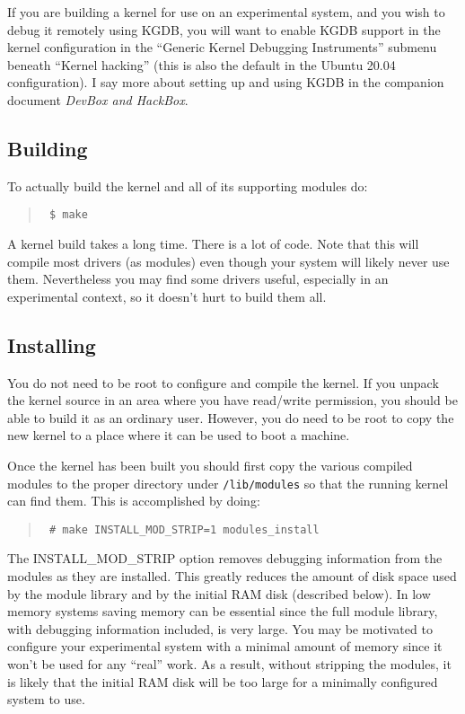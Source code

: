 \documentclass{article}
\newcommand{\filename}[1]{\texttt{#1}}
\newenvironment{commands}
  {\begin{quote} \tt}
  {\end{quote}}
\begin{document}
If you are building a kernel for use on an experimental system, and you wish to debug it
remotely using KGDB, you will want to enable KGDB support in the kernel configuration in the
``Generic Kernel Debugging Instruments'' submenu beneath ``Kernel hacking'' (this is also the
default in the Ubuntu 20.04 configuration). I say more about setting up and using KGDB in the
companion document \textit{DevBox and HackBox}.

\subsection{Building}
\label{sec:building}

To actually build the kernel and all of its supporting modules do:
\begin{commands}
  \$ make
\end{commands}

A kernel build takes a long time. There is a lot of code. Note that this will compile most
drivers (as modules) even though your system will likely never use them. Nevertheless you may
find some drivers useful, especially in an experimental context, so it doesn't hurt to build
them all.

\subsection{Installing}

You do not need to be root to configure and compile the kernel. If you unpack the kernel source
in an area where you have read/write permission, you should be able to build it as an ordinary
user. However, you do need to be root to copy the new kernel to a place where it can be used to
boot a machine.

Once the kernel has been built you should first copy the various compiled modules to the proper
directory under \filename{/lib/modules} so that the running kernel can find them. This is
accomplished by doing:
\begin{commands}
  \# make INSTALL\_MOD\_STRIP=1 modules\_install
\end{commands}

The INSTALL\_MOD\_STRIP option removes debugging information from the modules as they are
installed. This greatly reduces the amount of disk space used by the module library and by the
initial RAM disk (described below). In low memory systems saving memory can be essential since
the full module library, with debugging information included, is very large. You may be
motivated to configure your experimental system with a minimal amount of memory since it won't
be used for any ``real'' work. As a result, without stripping the modules, it is likely that the
initial RAM disk will be too large for a minimally configured system to use.
\end{document}

